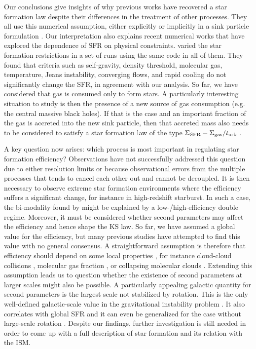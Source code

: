 \documentclass[twocolumn]{aastex}
\newcommand{\ssfr}{\Sigma_{\rm SFR}}
\newcommand{\torb}{t_{\rm orb}}
\newcommand{\sgas}{\Sigma_{\rm gas}}
\begin{document}
Our conclusions give insights of why previous works have recovered a star formation law despite their differences in the treatment of other processes. They all use this numerical assumption, either explicitly \citep{Kravtsov_03, Tasker_Bryan_06, Robertson_08} or implicitly in a sink particle formulation \citep{Li_05}. Our interpretation also explains recent numerical works that have explored the dependence of SFR on physical constraints. \citet{Hopkins_13} varied the star formation restrictions in a set of runs using the same code in all of them. They found that criteria such as self-gravity, density threshold, molecular gas, temperature, Jeans instability, converging flows, and rapid cooling do not significantly change the SFR, in agreement with our analysis. So far, we have considered that gas is consumed only to form stars. A particularly interesting situation to study is then the presence of a new source of gas consumption (e.g. the central massive black holes). If that is the case and an important fraction of the gas is accreted into the new sink particle, then that accreted mass also needs to be considered to satisfy a star formation law of the type $\ssfr - \sgas /\torb$ \citep{Escala_07}.

A key question now arises: which process is most important in regulating star formation efficiency? Observations have not successfully addressed this question due to either resolution limits or because observational errors from the multiple processes that tends to cancel each other out and cannot be decoupled. It is then necessary to observe extreme star formation environments where the efficiency suffers a significant change, for instance in high-redshift starburst. In such a case, the bi-modality found by \citet{Daddi_10, Genzel_10} might be explained by a low-/high-efficiency double regime. Moreover, it must be considered whether second parameters may affect the efficiency and hence shape the KS law. So far, we have assumed a global value for the efficiency, but many previous studies have attempted to find this value \citep{Krumholz_Tan_07, Hennebelle_11, Padoan_11} with no general consensus. A straightforward assumption is therefore that efficiency should depend on some local properties \citep[e.g.,][]{Federrath_12}, for instance cloud-cloud collisions \citep{Tan_00}, molecular gas fraction \citep{Krumholz_McKee_Tumlinson_09}, or collapsing molecular clouds \citep{Zamora-Aviles_12}. Extending this assumption leads us to question whether the existence of second parameters at larger scales might also be possible. A particularly appealing galactic quantity for second parameters is the largest scale not stabilized by rotation. This is the only well-defined galactic-scale value in the gravitational instability problem \citep{Escala_08}. It also correlates with global SFR \citep{Escala_11} and it can even be generalized for the case without large-scale rotation \citep[e.g., in galaxy merger;][]{Escala_13}. Despite our findings, further investigation is still needed in order to come up with a full description of star formation and its relation with the ISM.
\end{document}
